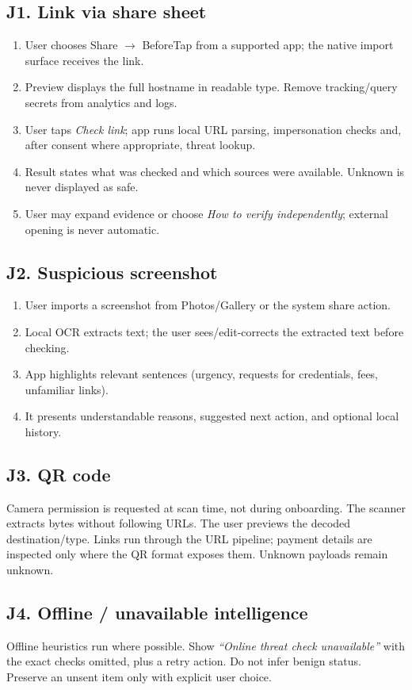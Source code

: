 \documentclass[10pt,a4paper]{article}
\begin{document}
\subsection{J1. Link via share sheet}
\begin{enumerate}
\item User chooses Share $\rightarrow$ BeforeTap from a supported app; the native import surface receives the link.
\item Preview displays the full hostname in readable type. Remove tracking/query secrets from analytics and logs.
\item User taps \emph{Check link}; app runs local URL parsing, impersonation checks and, after consent where appropriate, threat lookup.
\item Result states what was checked and which sources were available. Unknown is never displayed as safe.
\item User may expand evidence or choose \emph{How to verify independently}; external opening is never automatic.
\end{enumerate}
\subsection{J2. Suspicious screenshot}
\begin{enumerate}
\item User imports a screenshot from Photos/Gallery or the system share action.
\item Local OCR extracts text; the user sees/edit-corrects the extracted text before checking.
\item App highlights relevant sentences (urgency, requests for credentials, fees, unfamiliar links).
\item It presents understandable reasons, suggested next action, and optional local history.
\end{enumerate}
\subsection{J3. QR code}
Camera permission is requested at scan time, not during onboarding. The scanner extracts bytes without following URLs. The user previews the decoded destination/type. Links run through the URL pipeline; payment details are inspected only where the QR format exposes them. Unknown payloads remain unknown.
\subsection{J4. Offline / unavailable intelligence}
Offline heuristics run where possible. Show \emph{``Online threat check unavailable''} with the exact checks omitted, plus a retry action. Do not infer benign status. Preserve an unsent item only with explicit user choice.
\end{document}
